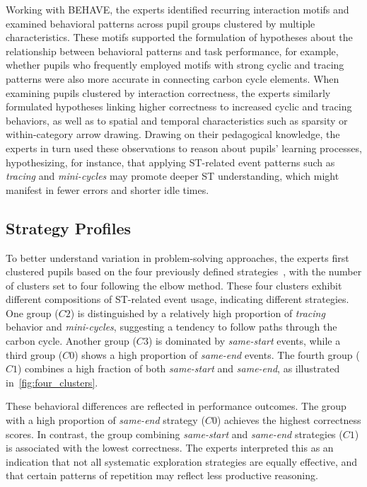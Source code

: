\documentclass[letterpaper,journal]{IEEEtran}
\begin{document}
Working with \textsc{BEHAVE}, the experts identified recurring interaction motifs and examined behavioral patterns across pupil groups clustered by multiple characteristics. 
These motifs supported the formulation of hypotheses about the relationship between behavioral patterns and task performance, for example, whether pupils who frequently employed motifs with strong cyclic and tracing patterns were also more accurate in connecting carbon cycle elements.
When examining pupils clustered by interaction correctness, the experts similarly formulated hypotheses linking higher correctness to increased cyclic and tracing behaviors, as well as to spatial and temporal characteristics such as sparsity or within-category arrow drawing.
Drawing on their pedagogical knowledge, the experts in turn used these observations to reason about pupils' learning processes, hypothesizing, for instance, that applying ST-related event patterns such as \textit{tracing} and \textit{mini-cycles} may promote deeper ST understanding, which might manifest in fewer errors and shorter idle times. 



\subsection{Strategy Profiles}

To better understand variation in problem-solving approaches, the experts first clustered pupils based on the four previously defined strategies~\cite{host2026pupils}, with the number of clusters set to four following the elbow method.
These four clusters exhibit different compositions of ST-related event usage, indicating different strategies.
One group ($C2$) is distinguished by a relatively high proportion of \textit{tracing} behavior and \textit{mini-cycles}, suggesting a tendency to follow paths through the carbon cycle.
Another group ($C3$) is dominated by \textit{same-start} events, while a third group ($C0$) shows a high proportion of \textit{same-end} events.
The fourth group ($C1$) combines a high fraction of both \textit{same-start} and \textit{same-end}, as illustrated in~\cref{fig:four_clusters}.

These behavioral differences are reflected in performance outcomes. 
The group with a high proportion of \textit{same-end} strategy ($C0$) achieves the highest correctness scores.
In contrast, the group combining \textit{same-start} and \textit{same-end} strategies ($C1$) is associated with the lowest correctness. 
The experts interpreted this as an indication that not all systematic exploration strategies are equally effective, and that certain patterns of repetition may reflect less productive reasoning.
\end{document}
